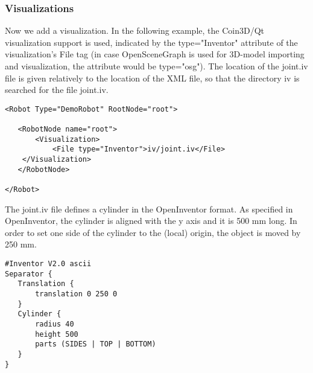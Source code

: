 \subsubsection*{Visualizations}
\par
Now we add a visualization. In the following example, the Coin3D/Qt visualization support is used, indicated by the type="Inventor" attribute of the visualization's File tag (in case OpenSceneGraph is used for 3D-model importing and visualization, the attribute would be type="osg"). The location of the joint.iv file is given relatively to the location of the XML file, so that the directory iv is searched for the file joint.iv. 
\begin{lstlisting}
<Robot Type="DemoRobot" RootNode="root">

   <RobotNode name="root">
       <Visualization>
           <File type="Inventor">iv/joint.iv</File>
    </Visualization>
   </RobotNode>

</Robot>
\end{lstlisting}
\par
The joint.iv file defines a cylinder in the OpenInventor format. As specified in OpenInventor, the cylinder is aligned with the y axis and it is 500 mm long. In order to set one side of the cylinder to the (local) origin, the object is moved by 250 mm. 
\par
\begin{lstlisting}
#Inventor V2.0 ascii
Separator {
   Translation {
       translation 0 250 0
   }
   Cylinder {
       radius 40
       height 500
       parts (SIDES | TOP | BOTTOM)
   }
}
\end{lstlisting}
\par
